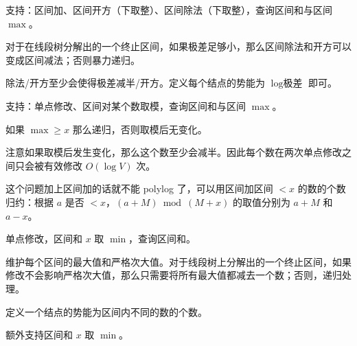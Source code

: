 \begin{example}[开方、除法]
    支持：区间加、区间开方（下取整）、区间除法（下取整），查询区间和与区间 $\max$。
\end{example}
\begin{solution}
    对于在线段树分解出的一个终止区间，如果极差足够小，那么区间除法和开方可以变成区间减法；否则暴力递归。

    除法/开方至少会使得极差减半/开方。定义每个结点的势能为 $\log\text{极差}$ 即可。
\end{solution}
\begin{example}[取模]
    支持：单点修改、区间对某个数取模，查询区间和与区间 $\max$。
\end{example}
\begin{solution}
    如果 $\max\ge x$ 那么递归，否则取模后无变化。

    注意如果取模后发生变化，那么这个数至少会减半。因此每个数在两次单点修改之间只会被有效修改 $O(\log V)$ 次。
\end{solution}
\begin{remark}
    这个问题加上区间加的话就不能 polylog 了，可以用区间加区间 $<x$ 的数的个数归约：根据 $a$ 是否 $<x$，$(a+M)\bmod (M+x)$ 的取值分别为 $a+M$ 和 $a-x$。
\end{remark}

\begin{exercise}[P3747]
\end{exercise}


\begin{example}
    单点修改，区间和 $x$ 取 $\min$，查询区间和。
\end{example}
\begin{solution}
    维护每个区间的最大值和严格次大值。对于线段树上分解出的一个终止区间，如果修改不会影响严格次大值，那么只需要将所有最大值都减去一个数；否则，递归处理。

    定义一个结点的势能为区间内不同的数的个数。
\end{solution}
\begin{exercise}
    额外支持区间和 $x$ 取 $\min$。
\end{exercise}

